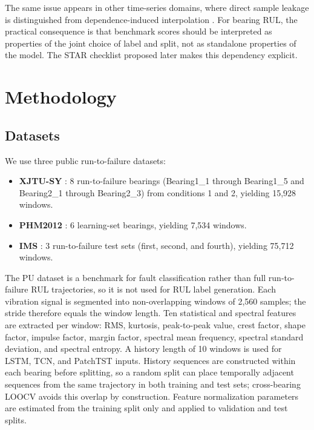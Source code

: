 \documentclass[pdflatex,sn-mathphys-num]{sn-jnl}
\begin{document}
The same issue appears in other time-series domains, where direct sample leakage is distinguished from dependence-induced interpolation \cite{leakage_nature,leakage_frontiers}. For bearing RUL, the practical consequence is that benchmark scores should be interpreted as properties of the joint choice of label and split, not as standalone properties of the model. The STAR checklist proposed later makes this dependency explicit.

\section{Methodology}
\subsection{Datasets}
We use three public run-to-failure datasets:
\begin{itemize}
    \item \textbf{XJTU-SY} \cite{xjtusy2019dataset}: 8 run-to-failure bearings (Bearing1\_1 through Bearing1\_5 and Bearing2\_1 through Bearing2\_3) from conditions 1 and 2, yielding 15,928 windows.
    \item \textbf{PHM2012} \cite{nectoux2012pronostia}: 6 learning-set bearings, yielding 7,534 windows.
    \item \textbf{IMS} \cite{ims2006}: 3 run-to-failure test sets (first, second, and fourth), yielding 75,712 windows.
\end{itemize}
The PU dataset is a benchmark for fault classification rather than full run-to-failure RUL trajectories, so it is not used for RUL label generation. Each vibration signal is segmented into non-overlapping windows of 2,560 samples; the stride therefore equals the window length. Ten statistical and spectral features are extracted per window: RMS, kurtosis, peak-to-peak value, crest factor, shape factor, impulse factor, margin factor, spectral mean frequency, spectral standard deviation, and spectral entropy. A history length of 10 windows is used for LSTM, TCN, and PatchTST inputs. History sequences are constructed within each bearing before splitting, so a random split can place temporally adjacent sequences from the same trajectory in both training and test sets; cross-bearing LOOCV avoids this overlap by construction. Feature normalization parameters are estimated from the training split only and applied to validation and test splits.
\end{document}
